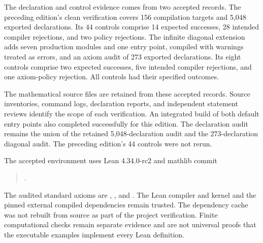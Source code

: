The declaration and control evidence comes from two accepted records. The preceding edition's clean verification covers 156 compilation targets and 5,048 exported declarations. Its 44 controls comprise 14 expected successes, 28 intended compiler rejections, and two policy rejections. The infinite diagonal extension adds seven production modules and one entry point, compiled with warnings treated as errors, and an axiom audit of 273 exported declarations. Its eight controls comprise two expected successes, five intended compiler rejections, and one axiom-policy rejection. All controls had their specified outcomes.

The mathematical source files are retained from these accepted records. Source inventories, command logs, declaration reports, and independent statement reviews identify the scope of each verification. An integrated build of both default entry points also completed successfully for this edition. The declaration audit remains the union of the retained 5,048-declaration audit and the 273-declaration diagonal audit. The preceding edition's 44 controls were not rerun.

The accepted environment uses Lean 4.34.0-rc2 and mathlib commit
\begin{quote}\small{}.\end{quote}
The audited standard axioms are , , and . The Lean compiler and kernel and the pinned external compiled dependencies remain trusted. The dependency cache was not rebuilt from source as part of the project verification. Finite computational checks remain separate evidence and are not universal proofs that the executable examples implement every Lean definition.
